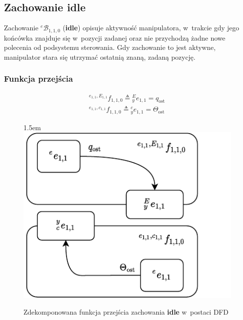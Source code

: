 \subsection{Zachowanie idle}
\label{subsec:ve-manip-idle}

Zachowanie ${}^{e}\mathcal{B}_{1,1,0}$ (\textbf{idle}) opisuje aktywność manipulatora, w~trakcie gdy jego końcówka znajduje się w~pozycji zadanej oraz nie przychodzą żadne nowe polecenia od podsystemu sterowania. Gdy zachowanie to jest aktywne, manipulator stara się utrzymać ostatnią znaną, zadaną pozycję. 

\subsubsection{Funkcja przejścia}
\begin{equation}
    \begin{gathered}
        {}^{e_{1,1}, E_{1,1}}f_{1,1,0} \triangleq {}^{E}_{y}e_{1,1} = q_{\mathrm{ost}}\\
        {}^{e_{1,1}, c_{1,1}}f_{1,1,0} \triangleq {}^{c}_{y}e_{1,1} = \Theta_{\mathrm{ost}}
    \end{gathered}
\end{equation}

\begin{figure}[ht]
    \leftskip1.5em
    \includegraphics[width=\columnwidth]{figures/ISR-ve-manip-fp-idle.pdf}
    \label{fig:ve-manip-fp-idle}
    \caption{Zdekomponowana funkcja przejścia zachowania \textbf{idle} w~postaci DFD}
\end{figure}

